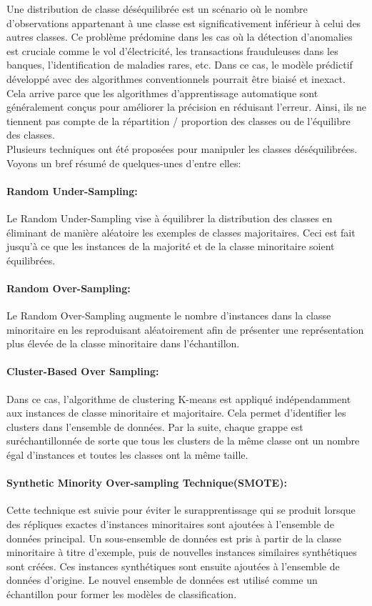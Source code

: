 \documentclass[12pt, french]{article}
\begin{document}
Une distribution de classe déséquilibrée est un scénario où le nombre d'observations appartenant à une classe est significativement inférieur à celui des autres classes. 
Ce problème prédomine dans les cas où la détection d'anomalies est cruciale comme le vol d'électricité, les transactions frauduleuses dans les banques, l'identification de maladies rares, etc. Dans ce cas, le modèle prédictif développé avec des algorithmes conventionnels pourrait être biaisé et inexact.\\
Cela arrive parce que les algorithmes d'apprentissage automatique sont généralement conçus pour améliorer la précision en réduisant l'erreur. Ainsi, ils ne tiennent pas compte de la répartition / proportion des classes ou de l'équilibre des classes.\\

Plusieurs techniques ont été proposées pour manipuler les classes déséquilibrées. Voyons un bref résumé de quelques-unes d'entre elles:
\paragraph{Random Under-Sampling:}
Le Random Under-Sampling vise à équilibrer la distribution des classes en éliminant de manière aléatoire les exemples de classes majoritaires. Ceci est fait jusqu'à ce que les instances de la majorité et de la classe minoritaire soient équilibrées.
\paragraph{Random Over-Sampling:}
Le Random Over-Sampling augmente le nombre d'instances dans la classe minoritaire en les reproduisant aléatoirement afin de présenter une représentation plus élevée de la classe minoritaire dans l'échantillon.
\paragraph{Cluster-Based Over Sampling:}
Dans ce cas, l'algorithme de clustering K-means est appliqué indépendamment aux instances de classe minoritaire et majoritaire. Cela permet d'identifier les clusters dans l'ensemble de données. Par la suite, chaque grappe est suréchantillonnée de sorte que tous les clusters de la même classe ont un nombre égal d'instances et toutes les classes ont la même taille.
\paragraph{Synthetic Minority Over-sampling Technique(SMOTE):}
Cette technique est suivie pour éviter le surapprentissage qui se produit lorsque des répliques exactes d'instances minoritaires sont ajoutées à l'ensemble de données principal. Un sous-ensemble de données est pris à partir de la classe minoritaire à titre d'exemple, puis de nouvelles instances similaires synthétiques sont créées. Ces instances synthétiques sont ensuite ajoutées à l'ensemble de données d'origine. Le nouvel ensemble de données est utilisé comme un échantillon pour former les modèles de classification.
\end{document}

